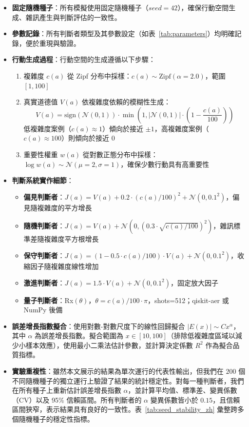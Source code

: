 \documentclass[12pt,a4paper]{article}
\theoremstyle{definition}
\theoremstyle{remark}
\begin{document}
\begin{itemize}
    \item \textbf{固定隨機種子}：所有模擬使用固定隨機種子（$seed = 42$），確保行動空間生成、雜訊產生與判斷評估的一致性。
    \item \textbf{參數記錄}：所有判斷者類型及其參數設定（如表~\ref{tab:parameters}）均明確記錄，便於重現與驗證。
    \item \textbf{行動生成過程}：行動空間的生成遵循以下步驟：
	    \begin{enumerate}
	        \item 複雜度 $c(a)$ 從 Zipf 分布中採樣：$c(a) \sim \text{Zipf}(\alpha=2.0)$，範圍 $[1, 100]$
	        \item 真實道德值 $V(a)$ 依複雜度依賴的模糊性生成：
	        \[
	        V(a) = \text{sign}(\mathcal{N}(0,1)) \cdot \min\left(1, |\mathcal{N}(0,1)| \cdot \left(1 - \frac{c(a)}{100}\right)\right)
	        \]
	        低複雜度案例（$c(a) \approx 1$）傾向於接近 $\pm 1$，高複雜度案例（$c(a) \approx 100$）則傾向於接近 $0$
	        \item 重要性權重 $w(a)$ 從對數正態分布中採樣：$\log w(a) \sim \mathcal{N}(\mu=2, \sigma=1)$，確保少數行動具有高重要性
	    \end{enumerate}
    \item \textbf{判斷系統實作細節}：
    \begin{itemize}
        \item \textbf{偏見判斷者}：$J(a) = V(a) + 0.2 \cdot (c(a)/100)^2 + \mathcal{N}(0, 0.1^2)$，偏見隨複雜度的平方增長
        \item \textbf{隨機判斷者}：$J(a) = V(a) + \mathcal{N}(0, (0.3 \cdot \sqrt{c(a)/100})^2)$，雜訊標準差隨複雜度平方根增長
        \item \textbf{保守判斷者}：$J(a) = (1 - 0.5 \cdot c(a)/100) \cdot V(a) + \mathcal{N}(0, 0.1^2)$，收縮因子隨複雜度線性增加
        \item \textbf{激進判斷者}：$J(a) = 1.5 \cdot V(a) + \mathcal{N}(0, 0.1^2)$，固定放大因子
        \item \textbf{量子判斷者}：Rx$(\theta)$，$\theta = c(a)/100 \cdot \pi$，shots=512；qiskit-aer 或 NumPy 後備
    \end{itemize}
    \item \textbf{誤差增長指數擬合}：使用對數-對數尺度下的線性回歸擬合 $|E(x)| \sim C x^\alpha$，其中 $\alpha$ 為誤差增長指數。擬合範圍為 $x \in [10, 100]$（排除低複雜度區域以減少小樣本效應），使用最小二乘法估計參數，並計算決定係數 $R^2$ 作為擬合品質指標。
    \item \textbf{實驗重複性}：雖然本文展示的結果為單次運行的代表性輸出，但我們在 $200$ 個不同隨機種子的獨立運行上驗證了結果的統計穩定性。對每一種判斷者，我們在所有種子上重新估計誤差增長指數 $\alpha$，並計算平均值、標準差、變異係數（CV）以及 95\% 信賴區間。所有判斷者的 $\alpha$ 變異係數皆小於 $0.15$，且信賴區間狹窄，表示結果具有良好的一致性。表~\ref{tab:seed_stability_zh} 彙整跨多個隨機種子的穩定性指標。
\end{itemize}
\end{document}
